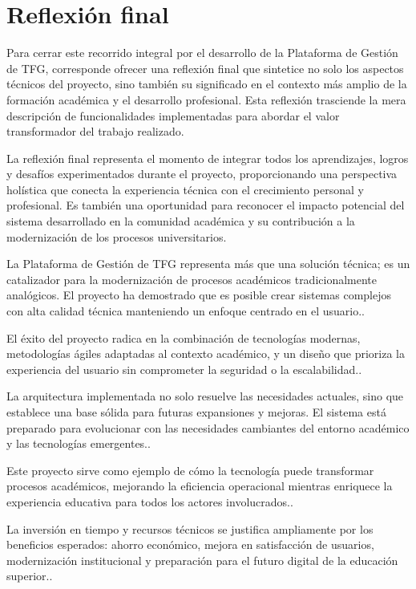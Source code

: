 \documentclass[12pt,a4paper,oneside]{report}
\begin{document}
\section{Reflexión final}\label{reflexiuxf3n-final}

Para cerrar este recorrido integral por el desarrollo de la Plataforma
de Gestión de TFG, corresponde ofrecer una reflexión final que sintetice
no solo los aspectos técnicos del proyecto, sino también su significado
en el contexto más amplio de la formación académica y el desarrollo
profesional. Esta reflexión trasciende la mera descripción de
funcionalidades implementadas para abordar el valor transformador del
trabajo realizado.

La reflexión final representa el momento de integrar todos los
aprendizajes, logros y desafíos experimentados durante el proyecto,
proporcionando una perspectiva holística que conecta la experiencia
técnica con el crecimiento personal y profesional. Es también una
oportunidad para reconocer el impacto potencial del sistema desarrollado
en la comunidad académica y su contribución a la modernización de los
procesos universitarios.

La Plataforma de Gestión de TFG representa más que una solución técnica;
es un catalizador para la modernización de procesos académicos
tradicionalmente analógicos. El proyecto ha demostrado que es posible
crear sistemas complejos con alta calidad técnica manteniendo un enfoque
centrado en el usuario..

El éxito del proyecto radica en la combinación de tecnologías modernas,
metodologías ágiles adaptadas al contexto académico, y un diseño que
prioriza la experiencia del usuario sin comprometer la seguridad o la
escalabilidad..

La arquitectura implementada no solo resuelve las necesidades actuales,
sino que establece una base sólida para futuras expansiones y mejoras.
El sistema está preparado para evolucionar con las necesidades
cambiantes del entorno académico y las tecnologías emergentes..

Este proyecto sirve como ejemplo de cómo la tecnología puede transformar
procesos académicos, mejorando la eficiencia operacional mientras
enriquece la experiencia educativa para todos los actores involucrados..

La inversión en tiempo y recursos técnicos se justifica ampliamente por
los beneficios esperados: ahorro económico, mejora en satisfacción de
usuarios, modernización institucional y preparación para el futuro
digital de la educación superior..
\end{document}
